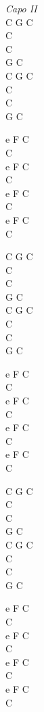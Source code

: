 \begin{chord}
    \textit{Capo II}\\
    C G C\\
    C\\
    C\\
    G C\\
    C G C\\
    C\\
    C\\
    G C

    e F C\\
    C\\
    e F C\\
    C\\
    e F C\\
    C\\
    e F C\\
    C

    C G C\\
    C\\
    C\\
    G C\\
    C G C\\
    C\\
    C\\
    G C

    e F C\\
    C\\
    e F C\\
    C\\
    e F C\\
    C\\
    e F C\\
    C

    C G C\\
    C\\
    C\\
    G C\\
    C G C\\
    C\\
    C\\
    G C

    e F C\\
    C\\
    e F C\\
    C\\
    e F C\\
    C\\
    e F C\\
    C
    \end{chord}
